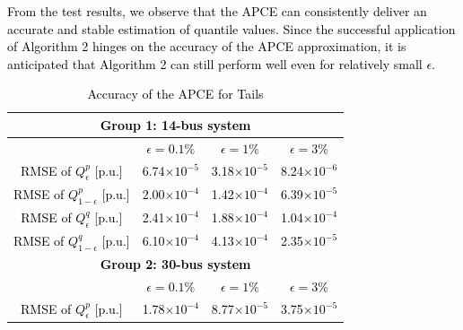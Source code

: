 \documentclass[journal]{IEEEtran}
\theoremstyle{definition}
\theoremstyle{remark}
\begin{document}
\textcolor{black}{From the test results, we observe that the APCE can consistently deliver an accurate and stable estimation of quantile values. Since the successful application of Algorithm 2 hinges on the accuracy of the APCE approximation, it is anticipated that Algorithm 2 can still perform well even for relatively small $\epsilon$.}
\begin{table}[t!]
\centering
\caption{\textcolor{black}{Accuracy of the APCE for Tails}}
\label{tab:4}
\begin{threeparttable}
\renewcommand{\arraystretch}{1.3}
\begin{tabular}{cccc} 
\toprule
\multicolumn{4}{c}{\textbf{\textcolor{black}{Group 1: 14-bus system}}}                     \\ 
\midrule
\multicolumn{1}{c}{} & \textcolor{black}{$\epsilon=0.1\%$} & \textcolor{black}{$\epsilon=1\%$} & \textcolor{black}{$\epsilon=3\%$} \\ 
\hline
\multicolumn{1}{c|}{\textcolor{black}{RMSE of $Q_{\epsilon}^{p}$ [p.u.]}} & \textcolor{black}{6.74$\times 10^{-5}$} & \textcolor{black}{3.18$\times 10^{-5}$} &  \textcolor{black}{8.24$\times 10^{-6}$}                          \\ 
\multicolumn{1}{c|}{\textcolor{black}{RMSE of $Q_{1-\epsilon}^{p}$ [p.u.]}} & \textcolor{black}{2.00$\times 10^{-4}$} & \textcolor{black}{1.42$\times 10^{-4}$} &  \textcolor{black}{6.39$\times 10^{-5}$}                                                      \\ 
\multicolumn{1}{c|}{\textcolor{black}{RMSE of $Q_{\epsilon}^{q}$ [p.u.]}} & \textcolor{black}{2.41$\times 10^{-4}$} & \textcolor{black}{1.88$\times 10^{-4}$} &  \textcolor{black}{1.04$\times 10^{-4}$}                                                      \\
\multicolumn{1}{c|}{\textcolor{black}{RMSE of $Q_{1-\epsilon}^{q}$ [p.u.]}} & \textcolor{black}{6.10$\times 10^{-4}$} & \textcolor{black}{4.13$\times 10^{-4}$} &  \textcolor{black}{2.35$\times 10^{-5}$}                                                      \\
\toprule
\multicolumn{4}{c}{\textbf{\textcolor{black}{Group 2: 30-bus system}}}                       \\ 
\midrule
\multicolumn{1}{c}{} & \textcolor{black}{$\epsilon=0.1\%$} & \textcolor{black}{$\epsilon=1\%$} & \textcolor{black}{$\epsilon=3\%$} \\ 
\hline
\multicolumn{1}{c|}{\textcolor{black}{RMSE of $Q_{\epsilon}^{p}$ [p.u.]}} & \textcolor{black}{1.78$\times 10^{-4}$} & \textcolor{black}{8.77$\times 10^{-5}$} &  \textcolor{black}{3.75$\times 10^{-5}$}                          \\  

\end{tabular}
\end{threeparttable}
\end{table}
\end{document}
